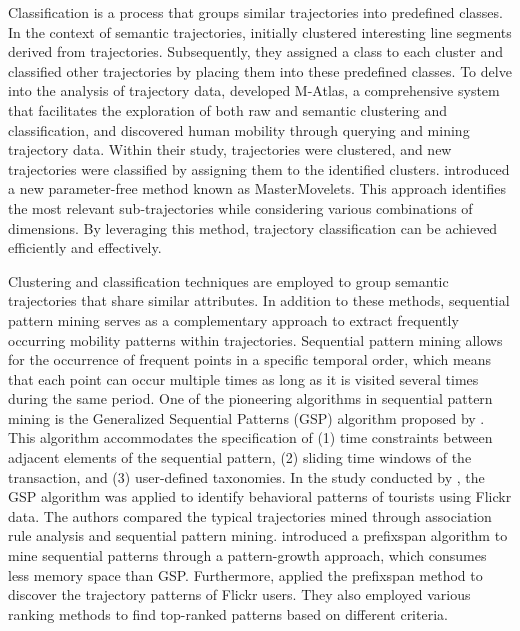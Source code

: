 \documentclass{article}
\theoremstyle{definition}
\theoremstyle{remark}
\begin{document}
Classification is a process that groups similar trajectories into predefined classes. In the context of semantic trajectories, \cite{lee_trajectory_2007} initially clustered interesting line segments derived from trajectories. Subsequently, they assigned a class to each cluster and classified other trajectories by placing them into these predefined classes. To delve into the analysis of trajectory data, \cite{giannotti_unveiling_2011} developed M-Atlas, a comprehensive system that facilitates the exploration of both raw and semantic clustering and classification, and discovered human mobility through querying and mining trajectory data. Within their study, trajectories were clustered, and new trajectories were classified by assigning them to the identified clusters. \cite{ferrero_mastermovelets_2020} introduced a new parameter-free method known as MasterMovelets. This approach identifies the most relevant sub-trajectories while considering various combinations of dimensions. By leveraging this method, trajectory classification can be achieved efficiently and effectively. 

Clustering and classification techniques are employed to group semantic trajectories that share similar attributes. In addition to these methods, sequential pattern mining serves as a complementary approach to extract frequently occurring mobility patterns within trajectories. Sequential pattern mining allows for the occurrence of frequent points in a specific temporal order, which means that each point can occur multiple times as long as it is visited several times during the same period. One of the pioneering algorithms in sequential pattern mining is the Generalized Sequential Patterns (GSP) algorithm proposed by \cite{srikant_mining_1996}. This algorithm accommodates the specification of (1) time constraints between adjacent elements of the sequential pattern, (2) sliding time windows of the transaction, and (3) user-defined taxonomies. In the study conducted by \cite{hopken_flickr_2020}, the GSP algorithm was applied to identify behavioral patterns of tourists using Flickr data. The authors compared the typical trajectories mined through association rule analysis and sequential pattern mining. \cite{pei_mining_2004} introduced a \acrfull{prefixspan} algorithm to mine sequential patterns through a pattern-growth approach, which consumes less memory space than GSP. Furthermore, \cite{yin_diversified_2011} applied the \acrshort{prefixspan} method to discover the trajectory patterns of Flickr users. They also employed various ranking methods to find top-ranked patterns based on different criteria.
\end{document}
